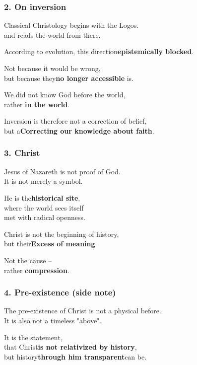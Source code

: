 \documentclass[
]{article}
\begin{document}
\subsubsection{\texorpdfstring{\textbf{2. On inversion}}{2. On inversion}}\label{on-inversion}

Classical Christology begins with the Logos.\\
and reads the world from there.

According to evolution, this direction\textbf{epistemically blocked}.

Not because it would be wrong,\\
but because they\textbf{no longer accessible} is.

We did not know God before the world,\\
rather \textbf{in the world}.

Inversion is therefore not a correction of belief,\\
but a\textbf{Correcting our knowledge about faith}.

\subsubsection{\texorpdfstring{\textbf{3. Christ}}{3. Christ}}\label{christ}

Jesus of Nazareth is not proof of God.\\
It is not merely a symbol.

He is the\textbf{historical site},\\
where the world sees itself\\
met with radical openness.

Christ is not the beginning of history,\\
but their\textbf{Excess of meaning}.

Not the cause --\\
rather \textbf{compression}.

\subsubsection{\texorpdfstring{\textbf{4. Pre-existence (side note)}}{4. Pre-existence (side note)}}\label{pre-existence-side-note}

The pre-existence of Christ is not a physical before.\\
It is also not a timeless "above".

It is the statement,\\
that Christ\textbf{is not relativized by history},\\
but history\textbf{through him transparent}can be.
\end{document}
